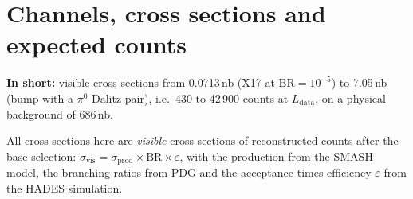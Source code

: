 \documentclass[11pt,a4paper]{article}
\newcommand{\piz}{\ensuremath{\pi^{0}}\xspace}
\newcommand{\Ldata}{\ensuremath{L_{\mathrm{data}}}\xspace}
\newcommand{\inshort}[1]{\par\noindent\colorbox{black!5}{\parbox{\dimexpr\linewidth-2\fboxsep\relax}{\textbf{In short:} #1}}\par}
\begin{document}
\section{Channels, cross sections and expected counts}
\label{sec:ch}
\inshort{visible cross sections from 0.0713\,nb (X17 at $\mathrm{BR}=10^{-5}$) to 7.05\,nb (bump with a \piz Dalitz
pair), i.e.\ 430 to 42\,900 counts at \Ldata, on a physical background of 686\,nb.}
All cross sections here are \emph{visible} cross sections of reconstructed counts after the base selection:
$\sigma_{\mathrm{vis}} = \sigma_{\mathrm{prod}}\times\mathrm{BR}\times\varepsilon$, with the production from the
SMASH model, the branching ratios from PDG and the acceptance times efficiency $\varepsilon$ from the HADES
simulation.
\end{document}
